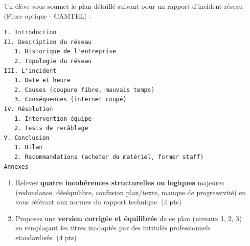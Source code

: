 \documentclass[11pt]{article}
\begin{document}
\begin{exercice}
Un élève vous soumet le plan détaillé suivant pour un rapport d'incident réseau (Fibre optique - CAMTEL) :

\begin{verbatim}
I. Introduction
II. Description du réseau
   1. Historique de l'entreprise
   2. Topologie du réseau
III. L'incident
   1. Date et heure
   2. Causes (coupure fibre, mauvais temps)
   3. Conséquences (internet coupé)
IV. Résolution
   1. Intervention équipe
   2. Tests de recâblage
V. Conclusion
   1. Bilan
   2. Recommandations (acheter du matériel, former staff)
Annexes
\end{verbatim}

\begin{enumerate}
\item Relevez \textbf{quatre incohérences structurelles ou logiques} majeures (redondance, déséquilibre, confusion plan/texte, manque de progressivité) en vous référant aux normes du rapport technique. \hfill (4 pts)
\item Proposez une \textbf{version corrigée et équilibrée} de ce plan (niveaux 1, 2, 3) en remplaçant les titres inadaptés par des intitulés professionnels standardisés. \hfill (4 pts)
\end{enumerate}
\end{exercice}
\end{document}
